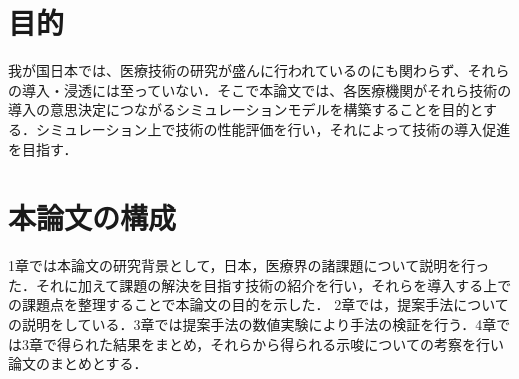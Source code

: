 \section{目的}

我が国日本では、医療技術の研究が盛んに行われているのにも関わらず、それらの導入・浸透には至っていない．そこで本論文では、各医療機関がそれら技術の導入の意思決定につながるシミュレーションモデルを構築することを目的とする．シミュレーション上で技術の性能評価を行い，それによって技術の導入促進を目指す．

\section{本論文の構成}

1章では本論文の研究背景として，日本，医療界の諸課題について説明を行った．それに加えて課題の解決を目指す技術の紹介を行い，それらを導入する上での課題点を整理することで本論文の目的を示した．
2章では，提案手法についての説明をしている．3章では提案手法の数値実験により手法の検証を行う．4章では3章で得られた結果をまとめ，それらから得られる示唆についての考察を行い論文のまとめとする．
